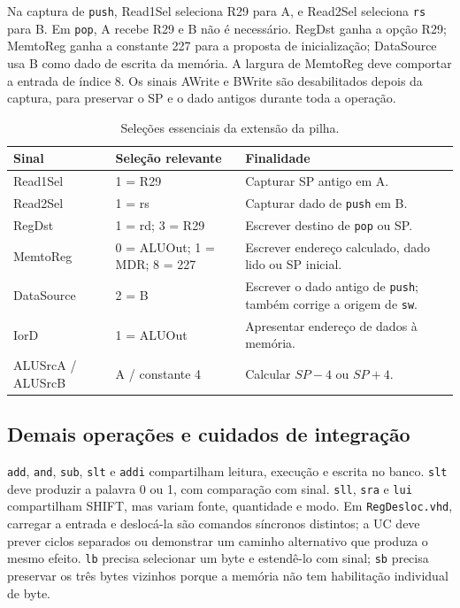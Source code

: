 Na captura de \texttt{push}, Read1Sel seleciona R29 para A, e Read2Sel seleciona \texttt{rs} para B. Em \texttt{pop}, A recebe R29 e B não é necessário. RegDst ganha a opção R29; MemtoReg ganha a constante 227 para a proposta de inicialização; DataSource usa B como dado de escrita da memória. A largura de MemtoReg deve comportar a entrada de índice 8. Os sinais AWrite e BWrite são desabilitados depois da captura, para preservar o SP e o dado antigos durante toda a operação.

\begin{table}[H]\centering\small
\caption{Seleções essenciais da extensão da pilha.}\label{tab:sinais-pilha}
\begin{tabularx}{\linewidth}{@{}p{3cm}p{4.3cm}X@{}}\toprule
Sinal & Seleção relevante & Finalidade \\\midrule
Read1Sel & 1 = R29 & Capturar SP antigo em A. \\
Read2Sel & 1 = rs & Capturar dado de \texttt{push} em B. \\
RegDst & 1 = rd; 3 = R29 & Escrever destino de \texttt{pop} ou SP. \\
MemtoReg & 0 = ALUOut; 1 = MDR; 8 = 227 & Escrever endereço calculado, dado lido ou SP inicial. \\
DataSource & 2 = B & Escrever o dado antigo de \texttt{push}; também corrige a origem de \texttt{sw}. \\
IorD & 1 = ALUOut & Apresentar endereço de dados à memória. \\
ALUSrcA / ALUSrcB & A / constante 4 & Calcular $SP-4$ ou $SP+4$. \\\bottomrule
\end{tabularx}
\end{table}

\subsection{Demais operações e cuidados de integração}\label{subsec:demais}

\texttt{add}, \texttt{and}, \texttt{sub}, \texttt{slt} e \texttt{addi} compartilham leitura, execução e escrita no banco. \texttt{slt} deve produzir a palavra 0 ou 1, com comparação com sinal. \texttt{sll}, \texttt{sra} e \texttt{lui} compartilham SHIFT, mas variam fonte, quantidade e modo. Em \texttt{RegDesloc.vhd}, carregar a entrada e deslocá-la são comandos síncronos distintos; a UC deve prever ciclos separados ou demonstrar um caminho alternativo que produza o mesmo efeito. \texttt{lb} precisa selecionar um byte e estendê-lo com sinal; \texttt{sb} precisa preservar os três bytes vizinhos porque a memória não tem habilitação individual de byte.

